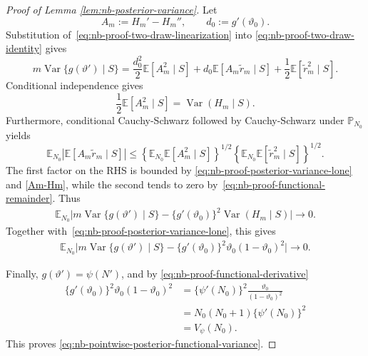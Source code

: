 \documentclass{article}
\theoremstyle{named}
\theoremstyle{named1}
\theoremstyle{plain}
\theoremstyle{remark}
\begin{document}
\begin{proof}[Proof of Lemma \ref{lem:nb-posterior-variance}]
Let 
\[
    A_m:=H_m'-H_m'',
    \qquad
    d_0:=g'(\vartheta_0).
\]
Substitution of~\eqref{eq:nb-proof-two-draw-linearization} into
\eqref{eq:nb-proof-two-draw-identity} gives
\begin{equation}
    m\operatorname{Var}\{g(\vartheta')\mid S\}
    =
    \frac{d_0^2}{2}\mathbb E[A_m^2\mid S]
    +
    d_0\mathbb E[A_m\widetilde r_m\mid S]
    +
    \frac12\mathbb E[\widetilde r_m^2\mid S].
    \label{eq:nb-proof-functional-variance-expansion}
\end{equation}
Conditional independence gives
\begin{equation}
    \frac12\mathbb E[A_m^2\mid S]
    =
    \operatorname{Var}(H_m\mid S). \label{Am-Hm}
\end{equation}
Furthermore, conditional Cauchy-Schwarz followed by
Cauchy-Schwarz under \(\mathbb P_{N_0}\) yields
\begin{equation*}
    \mathbb E_{N_0}
    \left|\mathbb E[A_m\widetilde r_m\mid S]\right|\leq
    \left\{
        \mathbb E_{N_0}\mathbb E[A_m^2\mid S]
    \right\}^{1/2}
    \left\{
        \mathbb E_{N_0}
        \mathbb E[\widetilde r_m^2\mid S]
    \right\}^{1/2}.
\end{equation*}
The first factor on the RHS is bounded by
\eqref{eq:nb-proof-posterior-variance-lone} and \eqref{Am-Hm}, while the second tends
to zero by~\eqref{eq:nb-proof-functional-remainder}. Thus
\begin{equation}
\begin{split}
    \mathbb E_{N_0}
    \bigg|
        m\operatorname{Var}\{g(\vartheta')\mid S\}
        -
        \{g'(\vartheta_0)\}^2
        \operatorname{Var}(H_m\mid S)
    \bigg|
    \rightarrow0.
\end{split}
    \label{eq:nb-proof-functional-variance-linear}
\end{equation}
Together with~\eqref{eq:nb-proof-posterior-variance-lone}, this gives
\begin{equation}
\begin{split}
    \mathbb E_{N_0}
    \bigg|
        m\operatorname{Var}\{g(\vartheta')\mid S\}
        -
        \{g'(\vartheta_0)\}^2
        \vartheta_0(1-\vartheta_0)^2
    \bigg|
    \rightarrow0.
\end{split}
    \label{eq:nb-proof-functional-variance-transformed}
\end{equation}

Finally, \(g(\vartheta')=\psi(N')\), and by \eqref{eq:nb-proof-functional-derivative}
\begin{align*}
    \{g'(\vartheta_0)\}^2
    \vartheta_0(1-\vartheta_0)^2
    &=
    \{\psi'(N_0)\}^2
    \frac{\vartheta_0}{(1-\vartheta_0)^2}
    \\
    &=
    N_0(N_0+1)\{\psi'(N_0)\}^2
    \\
    &=
    V_\psi(N_0).
\end{align*}
This proves
\eqref{eq:nb-pointwise-posterior-functional-variance}.



\end{proof}
\end{document}
